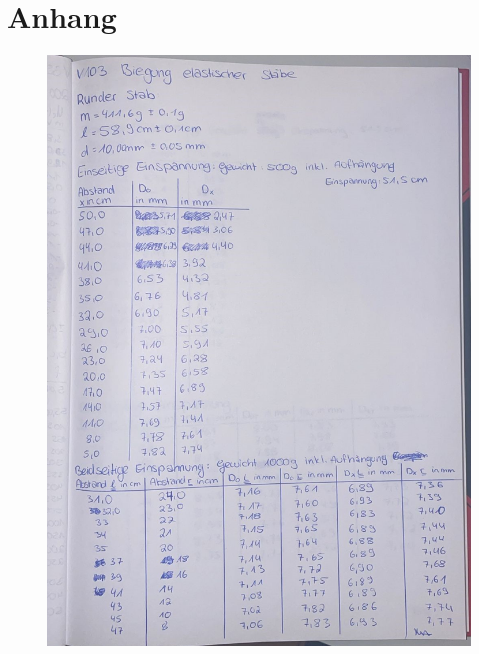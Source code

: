 \newpage
\section*{Anhang}
\label{sec:Anhang}
\begin{figure}
    \centering
    \includegraphics[width=\textwidth]{messdaten/messdaten1.jpg}
\end{figure}
